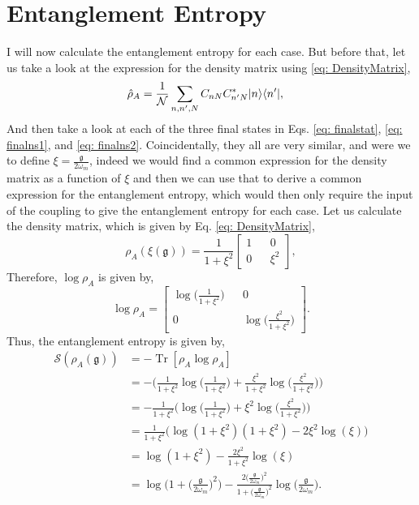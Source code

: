\documentclass[12pt,a4paper]{report}
\theoremstyle{plain}
\theoremstyle{definition}
\theoremstyle{remark}
\newcommand{\g}{\mathfrak{g}}
\DeclarePairedDelimiter\bra{\langle}{\rvert}
\DeclarePairedDelimiter\ket{\lvert}{\rangle}
\DeclareMathOperator{\Tr}{Tr}
\begin{document}
\section{Entanglement Entropy} \label{sec: EE}
I will now calculate the entanglement entropy for each case. But before that, let us take a look at the expression for the density matrix using \ref{eq: DensityMatrix},
\begin{equation}
    \begin{aligned}
        \hat{\rho}_A &= \frac{1}{\mathcal{N}} \sum_{n,n',N} C_{nN}C^{*}_{n'N} \ket{n}\bra{n'},
    \end{aligned}
\end{equation}
And then take a look at each of the three final states in Eqs. \ref{eq: finalstat}, \ref{eq: finalns1}, and \ref{eq: finalns2}. Coincidentally, they all are very similar, and were we to define $\xi = \frac{\g}{2\omega_m}$, indeed we would find a common expression for the density matrix as a function of $\xi$ and then we can use that to derive a common expression for the entanglement entropy, which would then only require the input of the coupling to give the entanglement entropy for each case.
Let us calculate the density matrix, which is given by Eq. \ref{eq: DensityMatrix},
\begin{equation}
    \rho_A(\xi(\mathfrak{g})) = \frac{1}{1+\xi^2}\begin{bmatrix}
        1 && 0\\
        0 && \xi^2
    \end{bmatrix},
\end{equation}
Therefore, $\log{\rho_A}$ is given by,
\begin{equation}
    \log\rho_A = \begin{bmatrix}
        \log{\big(\frac{1}{1+\xi^2}\big)} && 0\\
        0 && \log{\big(\frac{\xi^2}{1+\xi^2}}\big)
    \end{bmatrix}.
\end{equation}
Thus, the entanglement entropy is given by,
\begin{equation} \label{eq: EEfull}
    \begin{aligned}
        \mathcal{S}(\rho_A(\mathfrak{g})) &= -\Tr[\rho_A\log\rho_A] \\
        &= -\Bigg(\frac{1}{1+\xi^2}\log\bigg(\frac{1}{1+\xi^2}\bigg) + \frac{\xi^2}{1+\xi^2}\log{\bigg(\frac{\xi^2}{1+\xi^2}}\bigg)\Bigg) \\
        &= -\frac{1}{1+\xi^2}\Bigg(\log\bigg(\frac{1}{1+\xi^2}\bigg) + \xi^2\log{\bigg(\frac{\xi^2}{1+\xi^2}}\bigg)\Bigg)\\
        &= \frac{1}{1+\xi^2}\Bigg(\log(1 + \xi^2)(1+\xi^2) - 2 \xi^2 \log(\xi)\Bigg) \\
        &= \log(1 + \xi^2) - \frac{2\xi^2}{1+\xi^2}\log(\xi) \\
        &= \log\Bigg(1+ \Big(\frac{\mathfrak{g}}{2\omega_{m}}\Big)^2\Bigg) - \frac{2\Big(\frac{\mathfrak{g}}{2\omega_{m}}\Big)^2}{1+\Big(\frac{\mathfrak{g}}{2\omega_{m}}\Big)^2}\log\Big(\frac{\mathfrak{g}}{2\omega_{m}}\Big).
    \end{aligned}
\end{equation}
\end{document}
